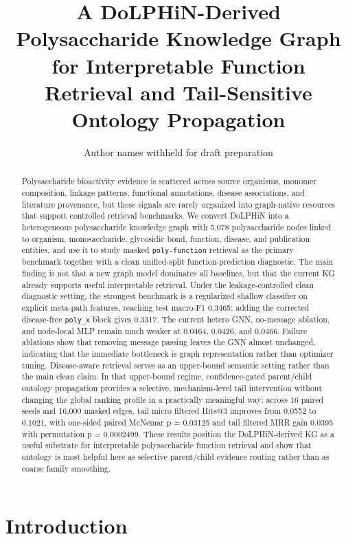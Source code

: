 \documentclass[11pt]{article}
\title{A DoLPHiN-Derived Polysaccharide Knowledge Graph for Interpretable Function Retrieval and Tail-Sensitive Ontology Propagation}
\author{Author names withheld for draft preparation}
\date{}
\begin{document}
\maketitle

\begin{abstract}
Polysaccharide bioactivity evidence is scattered across source organisms, monomer composition, linkage patterns, functional annotations, disease associations, and literature provenance, but these signals are rarely organized into graph-native resources that support controlled retrieval benchmarks. We convert DoLPHiN into a heterogeneous polysaccharide knowledge graph with 5,078 polysaccharide nodes linked to organism, monosaccharide, glycosidic bond, function, disease, and publication entities, and use it to study masked \texttt{poly-function} retrieval as the primary benchmark together with a clean unified-split function-prediction diagnostic. The main finding is not that a new graph model dominates all baselines, but that the current KG already supports useful interpretable retrieval. Under the leakage-controlled clean diagnostic setting, the strongest benchmark is a regularized shallow classifier on explicit meta-path features, reaching test macro-F1 0.3465; adding the corrected disease-free \texttt{poly\_x} block gives 0.3317. The current hetero GNN, no-message ablation, and node-local MLP remain much weaker at 0.0464, 0.0426, and 0.0466. Failure ablations show that removing message passing leaves the GNN almost unchanged, indicating that the immediate bottleneck is graph representation rather than optimizer tuning. Disease-aware retrieval serves as an upper-bound semantic setting rather than the main clean claim. In that upper-bound regime, confidence-gated parent/child ontology propagation provides a selective, mechanism-level tail intervention without changing the global ranking profile in a practically meaningful way: across 16 paired seeds and 16,000 masked edges, tail micro filtered Hits@3 improves from 0.0552 to 0.1021, with one-sided paired McNemar p = 0.03125 and tail filtered MRR gain 0.0395 with permutation p = 0.0002499. These results position the DoLPHiN-derived KG as a useful substrate for interpretable polysaccharide function retrieval and show that ontology is most helpful here as selective parent/child evidence routing rather than as coarse family smoothing.
\end{abstract}

\section{Introduction}
\label{sec:introduction}
\end{document}
